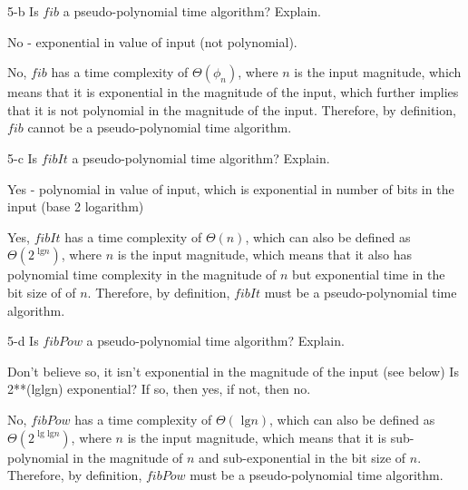 \documentclass[11pt]{article}
\newcommand{\tlg}{\text{ lg}}
\begin{document}
\begin{prob}{5-b}
Is $fib$ a pseudo-polynomial time algorithm? Explain.
\end{prob}
\begin{sol}
No - exponential in value of input (not polynomial).

No, $fib$ has a time complexity of $\Theta(\phi_{n})$, where $n$ is the input magnitude, which means that it is exponential in the magnitude of the input, which further implies that it is not polynomial in the magnitude of the input. Therefore, by definition, $fib$ cannot be a pseudo-polynomial time algorithm.
\end{sol}

\begin{prob}{5-c}
Is $fibIt$ a pseudo-polynomial time algorithm? Explain.
\end{prob}
\begin{sol}
Yes - polynomial in value of input, which is exponential in number of bits in the input (base 2 logarithm)

Yes, $fibIt$ has a time complexity of $\Theta(n)$, which can also be defined as $\Theta(2^{\tlg n})$, where $n$ is the input magnitude, which means that it also has polynomial time complexity in the magnitude of $n$ but exponential time in the bit size of of $n$. Therefore, by definition, $fibIt$ must be a pseudo-polynomial time algorithm.
\end{sol}

\begin{prob}{5-d}
Is $fibPow$ a pseudo-polynomial time algorithm? Explain.
\end{prob}
\begin{sol}
Don't believe so, it isn't exponential in the magnitude of the input (see below)
Is 2**(lglgn) exponential? If so, then yes, if not, then no.

No, $fibPow$ has a time complexity of $\Theta(\tlg n)$, which can also be defined as $\Theta(2^{\tlg \tlg n})$, where $n$ is the input magnitude, which means that it is sub-polynomial in the magnitude of $n$ and sub-exponential in the bit size of $n$. Therefore, by definition, $fibPow$ must be a pseudo-polynomial time algorithm.
\end{sol}
\end{document}
